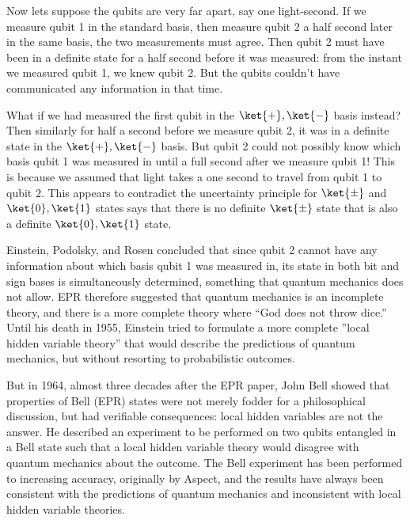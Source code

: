 \documentclass[12pt, oneside]{book}
\theoremstyle{definition}
\theoremstyle{definition}
\theoremstyle{remark}
\begin{document}
Now lets suppose the qubits are very far apart, say one light-second. If we measure qubit 1 in the standard basis, then measure qubit 2 a half second later in the same basis, the two measurements must agree. Then qubit 2 must have been in a definite state for a half second before it was measured: from the instant we measured qubit 1, we knew qubit 2. But the qubits couldn’t have communicated any information in that time. 

What if we had measured the first qubit in the $\ket{+},\ket{-}$ basis instead? Then similarly for half a second before we measure qubit 2, it was in a definite state in the $\ket{+},\ket{-}$ basis. But qubit 2 could not possibly know which basis qubit 1 was measured in until a full second after we measure qubit 1! This is because we assumed that light takes a one second to travel from qubit 1 to qubit 2. This appears to contradict the uncertainty principle for $\ket{\pm}$ and $\ket{0},\ket{1}$ states says that there is no definite $\ket{\pm}$ state that is also a definite $\ket{0},\ket{1}$ state.

Einstein, Podolsky, and Rosen concluded that since qubit 2 cannot have any information about which basis qubit 1 was measured in, its state in both bit and sign bases is simultaneously determined, something that quantum mechanics does not allow. EPR therefore suggested that quantum mechanics is an incomplete theory, and there is a more complete theory where ``God does not throw dice.” Until his death in 1955, Einstein tried to formulate a more complete ”local hidden variable theory” that would describe the predictions of quantum mechanics, but without resorting to probabilistic outcomes.

But in 1964, almost three decades after the EPR paper, John Bell showed that properties of Bell (EPR) states were not merely fodder for a philosophical discussion, but had verifiable consequences: local hidden variables are not the answer. He described an experiment to be performed on two qubits entangled in a Bell state such that a local hidden variable theory would disagree with quantum mechanics about the outcome. The Bell experiment has been performed to increasing accuracy, originally by Aspect, and the results have always been consistent with the predictions of quantum mechanics and inconsistent with local hidden variable theories.
\end{document}
